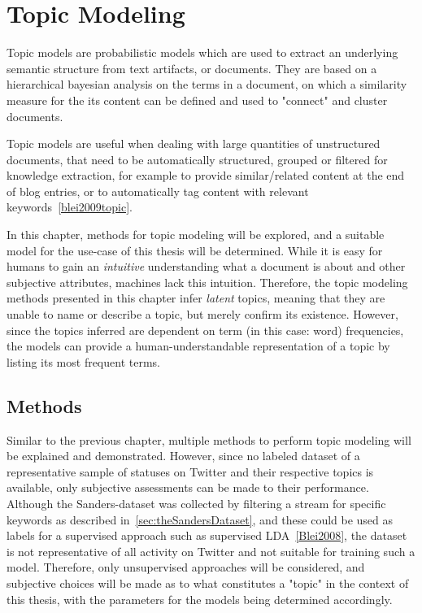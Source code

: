 \chapter{Topic Modeling}
\label{ch:topicModeling}

Topic models are probabilistic models which are used to extract an underlying semantic structure from text artifacts, or documents.
They are based on a hierarchical bayesian analysis on the terms in a document,
on which a similarity measure for the its content can be defined and used to "connect" and cluster documents.
\par
Topic models are useful when dealing with large quantities of unstructured documents,
that need to be automatically structured, grouped or filtered for knowledge extraction,
for example to provide similar/related content at the end of blog entries,
or to automatically tag content with relevant keywords~\ref{blei2009topic}.
\par
In this chapter, methods for topic modeling will be explored,
and a suitable model for the use-case of this thesis will be determined.
While it is easy for humans to gain an \textit{intuitive} understanding what a document is about
and other subjective attributes, machines lack this intuition.
Therefore, the topic modeling methods presented in this chapter infer \textit{latent} topics,
meaning that they are unable to name or describe a topic, but merely confirm its existence.
However, since the topics inferred are dependent on term (in this case: word) frequencies,
the models can provide a human-understandable representation of a topic by listing its most frequent terms.

\section{Methods}
\label{sec:methods}

Similar to the previous chapter, multiple methods to perform topic modeling will be explained and demonstrated.
However, since no labeled dataset of a representative sample of statuses on Twitter and their respective topics is available,
only subjective assessments can be made to their performance.
Although the Sanders-dataset was collected by filtering a stream for specific keywords as described in~\ref{sec:theSandersDataset},
and these could be used as labels for a supervised approach such as supervised LDA~\ref{Blei2008},
the dataset is not representative of all activity on Twitter and not suitable for training such a model.
Therefore, only unsupervised approaches will be considered,
and subjective choices will be made as to what constitutes a "topic" in the context of this thesis,
with the parameters for the models being determined accordingly.

